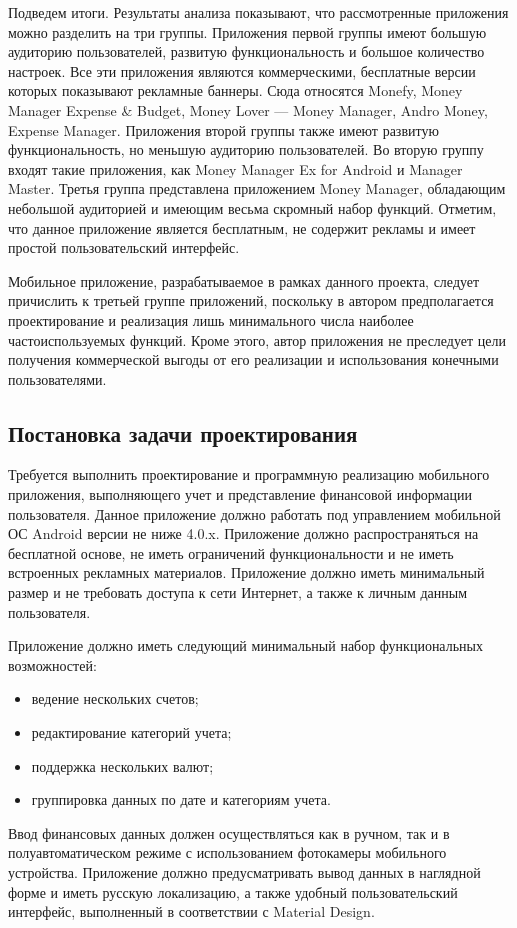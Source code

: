 Подведем итоги. Результаты анализа показывают, что рассмотренные приложения
можно разделить на три группы.
Приложения первой группы имеют большую аудиторию пользователей,
развитую функциональность и большое количество настроек.
Все эти приложения являются коммерческими,
бесплатные версии которых показывают рекламные баннеры.
Сюда относятся Monefy, Money Manager Expense \& Budget,
Money Lover --- Money Manager, Andro Money, Expense Manager.
Приложения второй группы также имеют развитую функциональность,
но меньшую аудиторию пользователей.
Во вторую группу входят такие приложения, как
Money Manager Ex for Android и Manager Master.
Третья группа представлена приложением Money Manager,
обладающим небольшой аудиторией и имеющим весьма скромный набор функций.
Отметим, что данное приложение является бесплатным,
не содержит рекламы и имеет простой пользовательский интерфейс.

Мобильное приложение, разрабатываемое в рамках данного проекта,
следует причислить к третьей группе приложений,
поскольку в автором предполагается проектирование и реализация лишь
минимального числа наиболее частоиспользуемых функций.
Кроме этого, автор приложения не преследует цели получения
коммерческой выгоды от его реализации и использования конечными пользователями.

\subsection{Постановка задачи проектирования}
\label{subsec:system_spec_task}

Требуется выполнить проектирование и
программную реализацию мобильного приложения, выполняющего учет и представление
финансовой информации пользователя. Данное приложение должно работать под управлением
мобильной ОС Android версии не ниже 4.0.x.
Приложение должно распространяться на бесплатной основе,
не иметь ограничений функциональности и не иметь встроенных рекламных материалов.
Приложение должно иметь минимальный размер и не требовать доступа к сети Интернет,
а также к личным данным пользователя.

Приложение должно иметь следующий минимальный набор функциональных возможностей:
\begin{itemize}
  \item ведение нескольких счетов;
  \item редактирование категорий учета;
  \item поддержка нескольких валют;
  \item группировка данных по дате и категориям учета.
\end{itemize}
Ввод финансовых данных должен осуществляться как в ручном,
так и в полуавтоматическом режиме с использованием фотокамеры мобильного устройства.
Приложение должно предусматривать вывод данных в наглядной форме и иметь
русскую локализацию, а также удобный пользовательский интерфейс,
выполненный в соответствии с Material Design.
